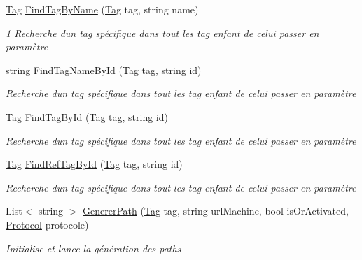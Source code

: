 \begin{DoxyCompactItemize}
\mbox{\hyperlink{class_m_t_connect_agent_1_1_model_1_1_tag}{Tag}} \mbox{\hyperlink{class_m_t_connect_agent_1_1_b_l_l_1_1_m_t_connect_client_adf30641f680b3a6ea91414aedc30c176}{Find\+Tag\+By\+Name}} (\mbox{\hyperlink{class_m_t_connect_agent_1_1_model_1_1_tag}{Tag}} tag, string name)
\begin{DoxyCompactList}\small\item\em 1 Recherche d\textquotesingle{}un tag spécifique dans tout les tag enfant de celui passer en paramètre \end{DoxyCompactList}\item 
string \mbox{\hyperlink{class_m_t_connect_agent_1_1_b_l_l_1_1_m_t_connect_client_a785a56a144ad88ed9b8c3efbcc046fde}{Find\+Tag\+Name\+By\+Id}} (\mbox{\hyperlink{class_m_t_connect_agent_1_1_model_1_1_tag}{Tag}} tag, string id)
\begin{DoxyCompactList}\small\item\em Recherche d\textquotesingle{}un tag spécifique dans tout les tag enfant de celui passer en paramètre \end{DoxyCompactList}\item 
\mbox{\hyperlink{class_m_t_connect_agent_1_1_model_1_1_tag}{Tag}} \mbox{\hyperlink{class_m_t_connect_agent_1_1_b_l_l_1_1_m_t_connect_client_a0deda7ea94d3370139eb1851c1e58bf8}{Find\+Tag\+By\+Id}} (\mbox{\hyperlink{class_m_t_connect_agent_1_1_model_1_1_tag}{Tag}} tag, string id)
\begin{DoxyCompactList}\small\item\em Recherche d\textquotesingle{}un tag spécifique dans tout les tag enfant de celui passer en paramètre \end{DoxyCompactList}\item 
\mbox{\hyperlink{class_m_t_connect_agent_1_1_model_1_1_tag}{Tag}} \mbox{\hyperlink{class_m_t_connect_agent_1_1_b_l_l_1_1_m_t_connect_client_a3a54cecea9664fb03bfbbaa4350f408c}{Find\+Ref\+Tag\+By\+Id}} (\mbox{\hyperlink{class_m_t_connect_agent_1_1_model_1_1_tag}{Tag}} tag, string id)
\begin{DoxyCompactList}\small\item\em Recherche d\textquotesingle{}un tag spécifique dans tout les tag enfant de celui passer en paramètre \end{DoxyCompactList}\item 
List$<$ string $>$ \mbox{\hyperlink{class_m_t_connect_agent_1_1_b_l_l_1_1_m_t_connect_client_a00fd074e11835791343b6d0c9c74b5f8}{Generer\+Path}} (\mbox{\hyperlink{class_m_t_connect_agent_1_1_model_1_1_tag}{Tag}} tag, string url\+Machine, bool is\+Or\+Activated, \mbox{\hyperlink{class_m_t_connect_agent_1_1_b_l_l_1_1_m_t_connect_client_a2f390f74a0ad3ee5147e9438ceed6474}{Protocol}} protocole)
\begin{DoxyCompactList}\small\item\em Initialise et lance la génération des paths \end{DoxyCompactList}\end{DoxyCompactItemize}
